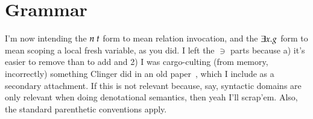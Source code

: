 \documentclass[11pt,twoside]{article}
\numberwithin{equation}{subsection} %
\begin{document}
\section{Grammar}

I'm now intending the $n\ t$ form to mean relation
invocation, and the $\exists x . g$ form to mean scoping a
local fresh variable, as you did. I left the $\ni$ parts because a)
it's easier to remove than to add and 2) I was cargo-culting (from
memory, incorrectly) something Clinger did in an old
paper~\cite{clinger1984scheme}, which I include as a secondary
attachment. If this is not relevant because, say, syntactic domains
are only relevant when doing denotational semantics, then yeah I'll
scrap'em. Also, the standard parenthetic conventions apply. \\

\vspace{.5cm}
\end{document}

